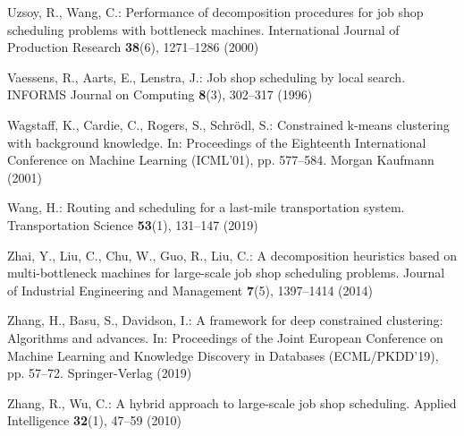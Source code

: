 \begin{thebibliography}{10}
Uzsoy, R., Wang, C.: Performance of decomposition procedures for job shop
  scheduling problems with bottleneck machines. International Journal of
  Production Research  \textbf{38}(6),  1271--1286 (2000)

Vaessens, R., Aarts, E., Lenstra, J.: Job shop scheduling by local search.
  INFORMS Journal on Computing  \textbf{8}(3),  302--317 (1996)

Wagstaff, K., Cardie, C., Rogers, S., Schr{\"{o}}dl, S.: Constrained k-means
  clustering with background knowledge. In: Proceedings of the Eighteenth
  International Conference on Machine Learning (ICML'01), pp. 577--584. Morgan
  Kaufmann (2001)

Wang, H.: Routing and scheduling for a last-mile transportation system.
  Transportation Science  \textbf{53}(1),  131--147 (2019)

Zhai, Y., Liu, C., Chu, W., Guo, R., Liu, C.: A decomposition heuristics based
  on multi-bottleneck machines for large-scale job shop scheduling problems.
  Journal of Industrial Engineering and Management  \textbf{7}(5),  1397--1414
  (2014)

Zhang, H., Basu, S., Davidson, I.: A framework for deep constrained clustering:
  Algorithms and advances. In: Proceedings of the Joint European Conference on
  Machine Learning and Knowledge Discovery in Databases (ECML/PKDD'19), pp.
  57--72. Springer-Verlag (2019)

Zhang, R., Wu, C.: A hybrid approach to large-scale job shop scheduling.
  Applied Intelligence  \textbf{32}(1),  47--59 (2010)

\end{thebibliography}
